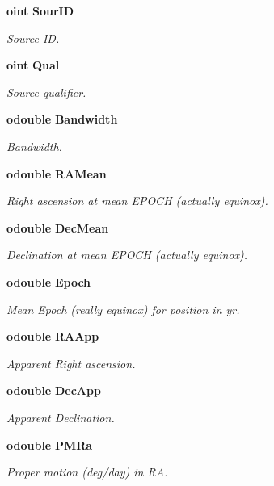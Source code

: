 \begin{CompactItemize}
{\bf oint} {\bf Sour\-ID}
\begin{CompactList}\small\item\em Source ID. \item\end{CompactList}\item 
{\bf oint} {\bf Qual}
\begin{CompactList}\small\item\em Source qualifier. \item\end{CompactList}\item 
{\bf odouble} {\bf Bandwidth}
\begin{CompactList}\small\item\em Bandwidth. \item\end{CompactList}\item 
{\bf odouble} {\bf RAMean}
\begin{CompactList}\small\item\em Right ascension at mean EPOCH (actually equinox). \item\end{CompactList}\item 
{\bf odouble} {\bf Dec\-Mean}
\begin{CompactList}\small\item\em Declination at mean EPOCH (actually equinox). \item\end{CompactList}\item 
{\bf odouble} {\bf Epoch}
\begin{CompactList}\small\item\em Mean Epoch (really equinox) for position in yr. \item\end{CompactList}\item 
{\bf odouble} {\bf RAApp}
\begin{CompactList}\small\item\em Apparent Right ascension. \item\end{CompactList}\item 
{\bf odouble} {\bf Dec\-App}
\begin{CompactList}\small\item\em Apparent Declination. \item\end{CompactList}\item 
{\bf odouble} {\bf PMRa}
\begin{CompactList}\small\item\em Proper motion (deg/day) in RA. \item\end{CompactList}\item 

\end{CompactItemize}
